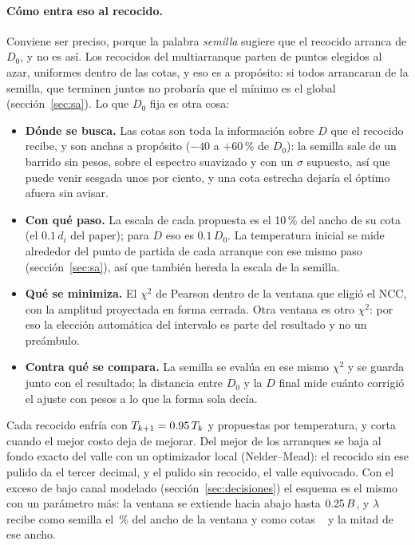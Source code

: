 \documentclass[11pt,a4paper]{article}
\begin{document}
\paragraph{Cómo entra eso al recocido.} Conviene ser preciso, porque la palabra
\emph{semilla} sugiere que el recocido arranca de $D_0$, y no es así. Los
\NArranques{} recocidos del multiarranque parten de puntos elegidos al azar,
uniformes dentro de las cotas, y eso es a propósito: si todos arrancaran de la
semilla, que terminen juntos no probaría que el mínimo es el global
(sección~\ref{sec:sa}). Lo que $D_0$ fija es otra cosa:
\begin{itemize}
\item \textbf{Dónde se busca.} Las cotas son toda la información sobre $D$ que
      el recocido recibe, y son anchas a propósito ($-40$ a $+60$\,\% de
      $D_0$): la semilla sale de un barrido sin pesos, sobre el espectro
      suavizado y con un $\sigma$ supuesto, así que puede venir sesgada unos
      por ciento, y una cota estrecha dejaría el óptimo afuera sin avisar.
\item \textbf{Con qué paso.} La escala de cada propuesta es el 10\,\% del
      ancho de su cota (el $0.1\,d_i$ del paper); para $D$ eso es $0.1\,D_0$.
      La temperatura inicial se mide alrededor del punto de partida de cada
      arranque con ese mismo paso (sección~\ref{sec:sa}), así que también
      hereda la escala de la semilla.
\item \textbf{Qué se minimiza.} El $\chi^2$ de Pearson dentro de la ventana que
      eligió el NCC, con la amplitud proyectada en forma cerrada. Otra ventana
      es otro $\chi^2$: por eso la elección automática del intervalo es parte
      del resultado y no un preámbulo.
\item \textbf{Contra qué se compara.} La semilla se evalúa en ese mismo
      $\chi^2$ y se guarda junto con el resultado; la distancia entre $D_0$ y
      la $D$ final mide cuánto corrigió el ajuste con pesos a lo que la forma
      sola decía.
\end{itemize}
Cada recocido enfría con $T_{k+1} = 0.95\,T_k$ y \NMarkov{} propuestas por
temperatura, y corta cuando el mejor costo deja de mejorar. Del mejor de los
\NArranques{} arranques se baja al fondo exacto del valle con un optimizador
local (Nelder--Mead): el recocido sin ese pulido da el tercer decimal, y el
pulido sin recocido, el valle equivocado. Con el exceso de bajo canal modelado
(sección~\ref{sec:decisiones}) el esquema es el mismo con un parámetro más:
la ventana se extiende hacia abajo hasta $0.25\,B$, y $\lambda$
recibe como semilla el \LambdaSemillaRel\,\% del ancho de la ventana y como
cotas \CotaLambdaMin~\mVns{} y la mitad de ese ancho.
\end{document}
